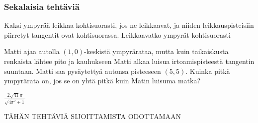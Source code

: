\begin{tehtavasivu}
\begin{tehtava}
\begin{vastaus}
\begin{alakohdat}
\end{alakohdat}
\end{vastaus}
\end{tehtava}

\subsubsection*{Sekalaisia tehtäviä}

\begin{tehtava}
Kaksi ympyrää leikkaa kohtisuorasti, jos ne leikkaavat, ja niiden leikkauspisteisiin piirretyt tangentit ovat kohtisuorassa. Leikkaavatko ympyrät kohtisuorasti
\begin{alakohdat}
\end{alakohdat}  
\begin{vastaus}
\begin{alakohdat}
\end{alakohdat}
\end{vastaus}
\end{tehtava}

\begin{tehtava}
Matti ajaa autolla $(1,0)$-keskistä ympyrärataa, mutta kuin taikaiskusta renkaista lähtee pito ja kauhukseen Matti alkaa luisua irtoamispisteestä tangentin suuntaan. Matti saa pysäytettyä autonsa pisteeseen $(5,5)$. Kuinka pitkä ympyrärata on, jos se on yhtä pitkä kuin Matin luisuma matka?
\begin{vastaus}
$\frac{2\sqrt{41}\pi}{\sqrt{4\pi^2+1}}$
\end{vastaus}
\end{tehtava}

TÄHÄN TEHTÄVIÄ SIJOITTAMISTA ODOTTAMAAN

\end{tehtavasivu}